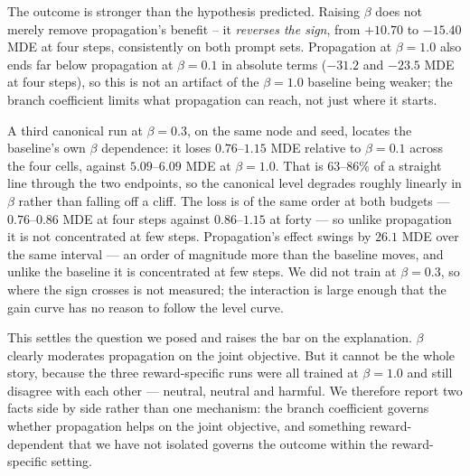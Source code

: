 The outcome is stronger than the hypothesis predicted. Raising $\beta$ does not merely
remove propagation's benefit -- it \emph{reverses the sign}, from $+10.70$ to $-15.40$ MDE
at four steps, consistently on both prompt sets. Propagation at $\beta=1.0$ also ends far
below propagation at $\beta=0.1$ in absolute terms ($-31.2$ and $-23.5$ MDE at four steps),
so this is not an artifact of the $\beta=1.0$ baseline being weaker; the branch coefficient
limits what propagation can reach, not just where it starts.

A third canonical run at $\beta=0.3$, on the same node and seed, locates the baseline's own
$\beta$ dependence: it loses $0.76$--$1.15$ MDE relative to $\beta=0.1$ across the four cells,
against $5.09$--$6.09$ MDE at $\beta=1.0$. That is $63$--$86\%$ of a straight line through the
two endpoints, so the canonical level degrades roughly linearly in $\beta$ rather than falling
off a cliff. The loss is of the same order at both budgets --- $0.76$--$0.86$ MDE at four steps
against $0.86$--$1.15$ at forty --- so unlike propagation it is not concentrated at few steps. Propagation's effect
swings by $26.1$ MDE over the same interval --- an order of magnitude more than the baseline
moves, and unlike the baseline it is concentrated at few steps. We did not train \MSP at
$\beta=0.3$, so where the sign crosses is not measured; the interaction is large enough that
the gain curve has no reason to follow the level curve.

This settles the question we posed and raises the bar on the explanation. $\beta$ clearly
moderates propagation on the joint objective. But it cannot be the whole story, because the
three reward-specific runs were all trained at $\beta=1.0$ and still disagree with each
other --- neutral, neutral and harmful. We therefore report two facts side by side rather
than one mechanism: the branch coefficient governs whether propagation helps on the joint
objective, and something reward-dependent that we have not isolated governs the outcome
within the reward-specific setting.
